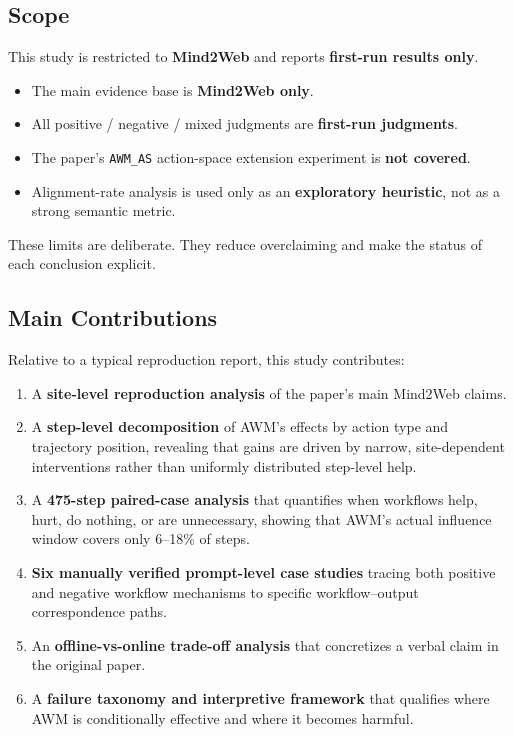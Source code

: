 \documentclass{article}
\providecommand{\tightlist}{%
  \setlength{\itemsep}{0pt}\setlength{\parskip}{0.8em}}
\begin{document}
\subsection{Scope}\label{scope}

This study is restricted to \textbf{Mind2Web} and reports
\textbf{first-run results only}.

\begin{itemize}
\tightlist
\item
  The main evidence base is \textbf{Mind2Web only}.
\item
  All positive / negative / mixed judgments are \textbf{first-run
  judgments}.
\item
  The paper's \texttt{AWM\_AS} action-space extension experiment is
  \textbf{not covered}.
\item
  Alignment-rate analysis is used only as an \textbf{exploratory
  heuristic}, not as a strong semantic metric.
\end{itemize}

These limits are deliberate. They reduce overclaiming and make the
status of each conclusion explicit.

\subsection{Main Contributions}\label{main-contributions}

Relative to a typical reproduction report, this study contributes:

\begin{enumerate}
\def\labelenumi{\arabic{enumi}.}
\tightlist
\item
  A \textbf{site-level reproduction analysis} of the paper's main
  Mind2Web claims.
\item
  A \textbf{step-level decomposition} of AWM's effects by action type
  and trajectory position, revealing that gains are driven by narrow,
  site-dependent interventions rather than uniformly distributed step-level help.
\item
  A \textbf{475-step paired-case analysis} that quantifies when
  workflows help, hurt, do nothing, or are unnecessary, showing that
  AWM's actual influence window covers only 6--18\% of steps.
\item
  \textbf{Six manually verified prompt-level case studies} tracing both
  positive and negative workflow mechanisms to specific workflow--output
  correspondence paths.
\item
  An \textbf{offline-vs-online trade-off analysis} that concretizes a
  verbal claim in the original paper.
\item
  A \textbf{failure taxonomy and interpretive framework} that qualifies
  where AWM is conditionally effective and where it becomes harmful.
\end{enumerate}
\end{document}
